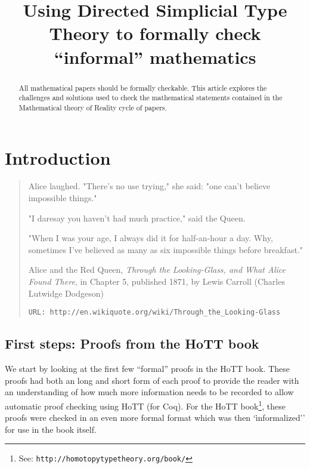 \documentclass[a4paper]{amsart}
\begin{document}
\sloppy

\title[Using DiSimplicil Theory]{Using Directed Simplicial Type Theory 
to formally check ``informal'' mathematics}
%
%
 
%

\begin{abstract}
%
All mathematical papers should be formally checkable.  This article 
explores the challenges and solutions used to check the mathematical 
statements contained in the Mathematical theory of Reality cycle of 
papers.
%
\end{abstract}
\maketitle
\tableofcontents

\section{Introduction}

\begin{quote}
%
Alice laughed. "There's no use trying," she said: "one can't believe 
impossible things." 

"I daresay you haven't had much practice," said the Queen. 

"When I was your age, I always did it for half-an-hour a day. Why, 
sometimes I've believed as many as six impossible things before 
breakfast."

Alice and the Red Queen, \textit{Through the Looking-Glass, and What 
Alice Found There}, in Chapter 5, published 1871, by Lewis Carroll (Charles Lutwidge 
Dodgeson)

\verb|URL: http://en.wikiquote.org/wiki/Through_the_Looking-Glass|
%
\end{quote}

\subsection{First steps: Proofs from the HoTT book}

We start by looking at the first few ``formal'' proofs in the HoTT 
book.  These proofs had both an long and short form of each proof to 
provide the reader with an understanding of how much more information 
needs to be recorded to allow automatic proof checking using HoTT (for 
Coq).  For the HoTT book\footnote{See: 
\texttt{http://homotopytypetheory.org/book/}}, these proofs were checked 
in an even more formal format which was then `ìnformalized'' for use in 
the book itself.
\end{document}
